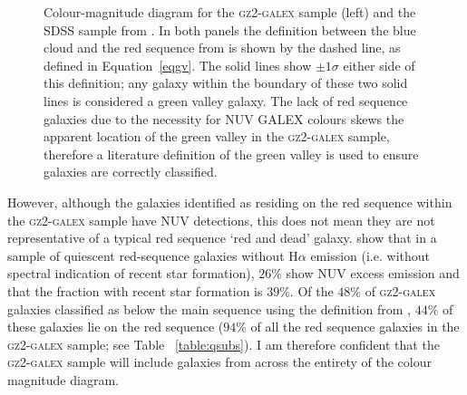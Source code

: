 \begin{figure}
\caption[Colour-magnitude diagram showing the location of the Baldry et al. (2004) green valley definition]{Colour-magnitude diagram for the \textsc{gz2-galex} sample (left) and the SDSS sample from \citet[][right]{Baldry04}. In both panels the definition between the blue cloud and the red sequence from \citet{Baldry04} is shown by the dashed line, as defined in Equation~\ref{eqgv}. The solid lines show $\pm 1\sigma$ either side of this definition; any galaxy within the boundary of these two solid lines is considered a green valley galaxy. The lack of red sequence galaxies due to the necessity for NUV GALEX colours skews the apparent location of the green valley in the \textsc{gz2-galex} sample, therefore a literature definition of the green valley is used to ensure galaxies are correctly classified.}
\label{fig:CMGV}
\end{figure}

However, although the galaxies identified as residing on the red sequence within the \textsc{gz2-galex} sample have NUV detections, this does not mean they are not representative of a typical red sequence `red and dead' galaxy. \cite{ko13} show that in a sample of quiescent red-sequence galaxies without $\mathrm{H}\alpha$ emission (i.e. without spectral indication of recent star formation), $26\%$ show NUV excess emission and that the fraction with recent star formation is $39\%$. Of the $48\%$ of \textsc{gz2-galex} galaxies classified as below the main sequence using the definition from \citet[][see Section~\ref{qmod}]{peng10}, $44\%$ of these galaxies lie on the red sequence ($94\%$ of all the red sequence galaxies in the \textsc{gz2-galex} sample; see Table ~\ref{table:qsubs}). I am therefore confident that the \textsc{gz2-galex} sample will include galaxies from across the entirety of the colour magnitude diagram. 

